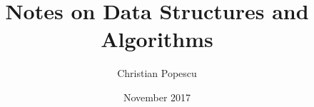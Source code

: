 \documentclass[a4paper,12pt]{book}
\begin{document}
\author{Christian Popescu}
\title{Notes on Data Structures and Algorithms}
\date{November 2017}

\frontmatter
\maketitle
\tableofcontents

\mainmatter





\backmatter
\end{document}
